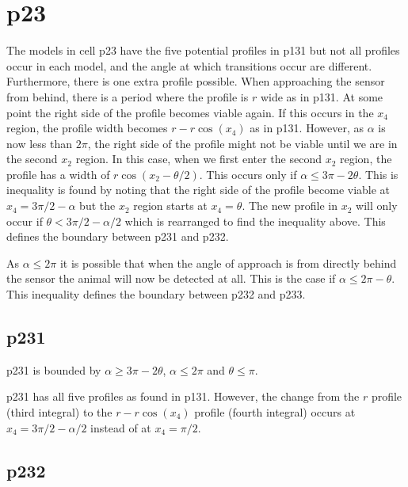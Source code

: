 

\section{p23} \label{p23}

The models in cell p23 have the five potential profiles in p131 but not all profiles occur in each model, and the angle at which transitions occur are different. Furthermore, there is one extra profile possible. When approaching the sensor from behind, there is a period where the profile is $r$ wide as in p131. At some point the right side of the profile becomes viable again. If this occurs in the $x_4$ region, the profile width becomes  $r - r\cos(x_4)$ as in p131. However, as $\alpha$ is now less than $2\pi$, the right side of the profile might not be viable until we are in the second $x_2$ region. In this case, when we first enter the second $x_2$ region, the profile has a width of $r\cos(x_2 - \theta/2)$. This occurs only if $\alpha \le 3\pi - 2\theta$. This is inequality is found by noting that the right side of the profile become viable at $x_4 = 3\pi/2 - \alpha$ but the $x_2$ region starts at $x_4 = \theta$. The new profile in $x_2$ will only occur if  $ \theta < 3\pi/2 - \alpha/2$ which is rearranged to find the inequality above. This defines the boundary between p231 and p232.

As $\alpha \le 2\pi$ it is possible that when the angle of approach is from directly behind the sensor the animal will now be detected at all. This is the case if $\alpha\le 2\pi-\theta$. This inequality defines the boundary between p232 and p233.



\subsection{p231} \label{p231}

p231 is bounded by $\alpha \ge 3\pi - 2\theta$, $\alpha \le 2\pi$ and $\theta\le\pi$.

p231 has all five profiles as found in p131. However, the change from the $r$ profile (third integral) to the $r - r\cos(x_4)$ profile (fourth integral) occurs at $x_4 = 3\pi/2 - \alpha/2$ instead of at $x_4 = \pi/2$. 




\subsection{p232} \label{p232}

